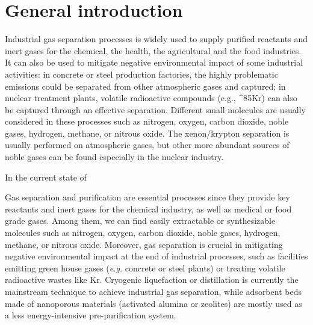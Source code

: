 
\chapter*{General introduction}


Industrial gas separation processes is widely used to supply purified reactants and inert gases for the chemical, the health, the agricultural and the food industries. It can also be used to mitigate negative environmental impact of some industrial activities: in concrete or steel production factories, the highly problematic  emissions could be separated from other atmospheric gases and captured; in nuclear treatment plants, volatile radioactive compounds (e.g., ^{85}Kr) can also be captured through an effective separation. Different small molecules are usually considered in these processes such as nitrogen, oxygen, carbon
dioxide, noble gases, hydrogen, methane, or nitrous oxide. The xenon/krypton separation is usually performed on atmospheric gases,\autocite{kerry2007industrial} but other more abundant sources of noble gases can be found especially in the nuclear industry.\autocite{Banerjee_2014} 


In the current state of 





Gas separation and purification are essential processes since they provide key reactants and inert gases for the chemical industry, as well as medical or food grade gases. Among them, we can find easily extractable or synthesizable molecules such as nitrogen, oxygen, carbon dioxide, noble gases, hydrogen, methane, or nitrous oxide. Moreover, gas separation is crucial in mitigating negative environmental impact at the end of industrial processes, such as facilities emitting green house gases (\emph{e.g.} concrete or steel plants) or treating volatile radioactive wastes like Kr. Cryogenic liquefaction or distillation is currently the mainstream technique to achieve industrial gas separation, while adsorbent beds made of nanoporous materials (activated alumina or zeolites) are mostly used as a less energy-intensive pre-purification system.\autocite{kerry2007industrial}

